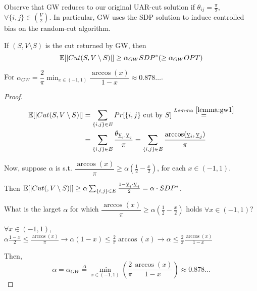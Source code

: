     Observe that GW reduces to our original UAR-cut solution if $\theta_{ij} = \frac{\pi}{2}$, $\forall \{i,j\} \in \binom{V}{2}$.
    In particular, GW uses the SDP solution to induce controlled bias on the random-cut algorithm.

    \begin{theorem}
        If $(S, V \setminus S)$ is the cut returned by GW, then
        \[ \mathbb{E}[\vert Cut(S, V \setminus S) \vert] \geq \alpha_{GW} SDP^* (\geq \alpha_{GW} OPT) \]

        For $\alpha_{GW} = \dfrac{2}{\pi} \min_{x \in (-1,1)} \dfrac{\arccos (x)}{1-x} \approx 0.878\dots$.
    \end{theorem}

    \begin{proof}

        \begin{equation*}
            \begin{split}
                \mathbb{E}[\vert Cut(S,V \setminus S) \vert] &= \sum_{\{i,j\} \in E} Pr[\{i,j\} \text{ cut by } S] \overset{Lemma~\ref{lemma:gw1}}{=}\\
                    &= \sum_{\{i,j\} \in E} \dfrac{\theta_{\underbar{v}_i,\underbar{v}_j}}{\pi} = \sum_{\{i,j\} \in E} \dfrac{\arccos(\underbar{v}_i, \underbar{v}_j)}{\pi}
            \end{split}
        \end{equation*}

        Now, suppose $\alpha$ is s.t.  $\dfrac{\arccos(x)}{\pi} \geq \alpha (\frac{1}{2} - \frac{x}{2})$, for each $x \in (-1,1)$.

        Then $\mathbb{E}[\vert Cut(, V \setminus S) \vert] \geq \alpha \sum_{\{i,j\} \in E} \frac{1 - \underbar{v}_i \cdot \underbar{v}_j}{2} = \alpha \cdot SDP^*$.

        What is the larget $\alpha$ for which $\dfrac{\arccos(x)}{\pi} \geq \alpha (\frac{1}{2} - \frac{x}{2})$ holds $\forall x \in (-1,1)$?

        $\forall x \in (-1,1)$,
        $\alpha  \frac{1-x}{2} \leq \frac{\arccos(x)}{\pi} \rightarrow
        \alpha (1-x) \leq \frac{2}{\pi} \arccos(x) \rightarrow
        \alpha \leq \frac{2}{\pi} \frac{\arccos(x)}{1-x}$

        Then,
        \[ \alpha = \alpha_{GW} \overset{\Delta}{=} \min_{x \in (-1,1)} (\frac{2}{\pi} \frac{\arccos(x)}{1-x}) \approx 0.878\dots \]
    \end{proof}

